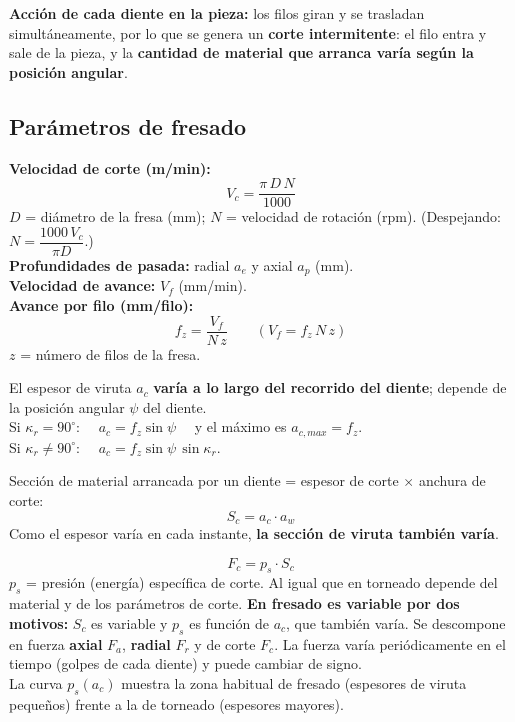 \documentclass[12pt,a4paper]{article}
\begin{document}
\textbf{Acción de cada diente en la pieza:} los filos giran y se trasladan
simultáneamente, por lo que se genera un \textbf{corte intermitente}: el filo
entra y sale de la pieza, y la \textbf{cantidad de material que arranca varía
	según la posición angular}.

\subsection{Parámetros de fresado}

\begin{formu}
	\textbf{Velocidad de corte (m/min):}
	\[ V_c = \frac{\pi\, D\, N}{1000} \]
	$D$ = diámetro de la fresa (mm); $N$ = velocidad de rotación (rpm).
	(Despejando:
	$N = \dfrac{1000\,V_c}{\pi D}$.)\\[4pt]
	\textbf{Profundidades de pasada:} radial $a_e$ y axial $a_p$ (mm).\\[4pt]
	\textbf{Velocidad de avance:} $V_f$ (mm/min).\\[4pt]
	\textbf{Avance por filo (mm/filo):}
	\[ f_z = \frac{V_f}{N\, z} \qquad\left(V_f = f_z\, N\, z\right) \]
	$z$ = número de filos de la fresa.
\end{formu}

\begin{formu}
	El espesor de viruta $a_c$ \textbf{varía a lo largo del recorrido del diente};
	depende de la posición angular $\psi$ del diente.\\[3pt]
	Si $\kappa_r = 90^\circ$: $\quad a_c = f_z \sin\psi \quad$ y el máximo es
	$a_{c,max} = f_z$.\\[3pt]
	Si $\kappa_r \neq 90^\circ$: $\quad a_c = f_z \sin\psi\,\sin\kappa_r$.
\end{formu}

\begin{formu}
	Sección de material arrancada por un diente = espesor de corte $\times$
	anchura de corte:
	\[ S_c = a_c \cdot a_w \]
	Como el espesor varía en cada instante, \textbf{la sección de viruta también
		varía}.
\end{formu}

\begin{formu}
	\[ F_c = p_s \cdot S_c \]
	$p_s$ = presión (energía) específica de corte. Al igual que en torneado
	depende del material y de los parámetros de corte. \textbf{En fresado es
		variable por dos motivos:} $S_c$ es variable y $p_s$ es función de $a_c$,
	que
	también varía. Se descompone en fuerza \textbf{axial} $F_a$, \textbf{radial}
	$F_r$ y de corte $F_c$. La fuerza varía periódicamente en el tiempo (golpes de
	cada diente) y puede cambiar de signo.\\
	La curva $p_s(a_c)$ muestra la zona habitual de fresado (espesores de viruta
	pequeños) frente a la de torneado (espesores mayores).
\end{formu}
\end{document}
